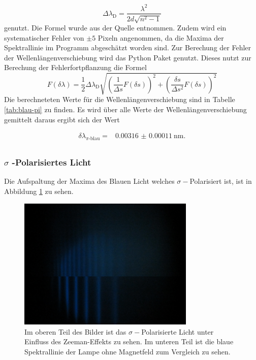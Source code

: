 \begin{equation*}
    \Delta \lambda _\text{D} = \frac{\lambda^2}{2d\sqrt{n^2-1}}
\end{equation*}
genutzt. Die Formel wurde aus der Quelle \cite[4]{anleitung} entnommen.
Zudem wird ein systematischer Fehler von $\pm 5$ Pixeln angenommen, da die Maxima der Spektrallinie im Programm \cite{paint3d} abgeschätzt worden sind.
Zur Berechung der Fehler der Wellenlängenverschiebung wird das Python Paket \cite{uncertainties} genutzt.
Dieses nutzt zur Berechung der Fehlerfortpflanzung die Formel
\begin{equation}
    F(\delta \lambda) = \frac{1}{2} \Delta \lambda _\text{D} \sqrt{\left (\frac{1}{\Delta s} F(\delta s) \right)^2 + \left ( \frac{\delta s}{\Delta s^2} F(\delta s) \right )^2}
    \label{eq:fehler_Wellenlängenverschiebung}
\end{equation}
Die berechneteten Werte für die Wellenlängenverschiebung sind in Tabelle \autoref{tab:blau-pi} zu finden.
Es wird über alle Werte der Wellenlängenverschiebung gemittelt daraus ergibt sich der Wert

\begin{align*}
    \delta \lambda _\text{$\pi$-blau} = & \SI{0.00316(011)}{\nano\meter}. \\
\end{align*}

\subsubsection{\boldmath\texorpdfstring{$\sigma$}{sigma} -Polarisiertes Licht}

Die Aufspaltung der Maxima des Blauen Licht welches $\sigma -$Polarisiert ist, ist in Abbildung \ref{fig:sigma-blau} zu sehen.

\begin{figure}
    \centering
    \includegraphics[width=0.75\textwidth]{content/data/Blue_sigma_0_uebernander.JPG}
    \caption{Im oberen Teil des Bilder ist das $\sigma -$Polarisierte Licht unter Einfluss des Zeeman-Effekts zu sehen. Im unteren Teil ist die blaue Spektrallinie der Lampe ohne Magnetfeld zum Vergleich zu sehen.}
    \label{fig:sigma-blau}
\end{figure}

